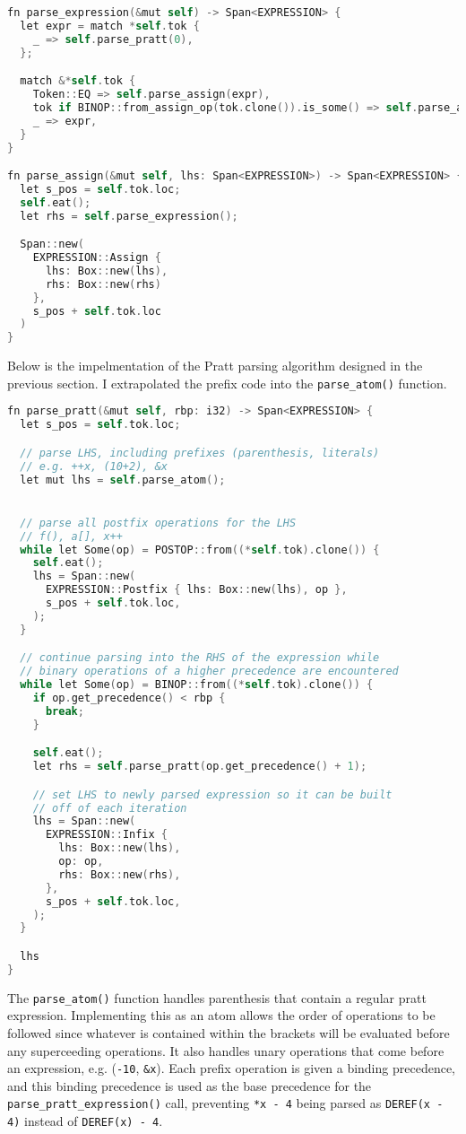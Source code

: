 \begin{lstlisting}[language=C]
fn parse_expression(&mut self) -> Span<EXPRESSION> {
  let expr = match *self.tok {
    _ => self.parse_pratt(0),
  };

  match &*self.tok {
    Token::EQ => self.parse_assign(expr),
    tok if BINOP::from_assign_op(tok.clone()).is_some() => self.parse_assign_op(expr),
    _ => expr,
  }
}

fn parse_assign(&mut self, lhs: Span<EXPRESSION>) -> Span<EXPRESSION> {
  let s_pos = self.tok.loc;
  self.eat();
  let rhs = self.parse_expression();

  Span::new(
    EXPRESSION::Assign { 
      lhs: Box::new(lhs), 
      rhs: Box::new(rhs) 
    }, 
    s_pos + self.tok.loc
  )
}
\end{lstlisting}

Below is the impelmentation of the Pratt parsing algorithm designed in the previous section. I extrapolated the prefix code into the \texttt{parse\_atom()} function. 

\label{PrattParser}
\begin{lstlisting}[language=C]
fn parse_pratt(&mut self, rbp: i32) -> Span<EXPRESSION> {
  let s_pos = self.tok.loc;

  // parse LHS, including prefixes (parenthesis, literals)
  // e.g. ++x, (10+2), &x
  let mut lhs = self.parse_atom();


  // parse all postfix operations for the LHS
  // f(), a[], x++
  while let Some(op) = POSTOP::from((*self.tok).clone()) {
    self.eat();
    lhs = Span::new(
      EXPRESSION::Postfix { lhs: Box::new(lhs), op },
      s_pos + self.tok.loc,
    );
  }

  // continue parsing into the RHS of the expression while 
  // binary operations of a higher precedence are encountered
  while let Some(op) = BINOP::from((*self.tok).clone()) {
    if op.get_precedence() < rbp {
      break;
    }

    self.eat();
    let rhs = self.parse_pratt(op.get_precedence() + 1);

    // set LHS to newly parsed expression so it can be built
    // off of each iteration 
    lhs = Span::new(
      EXPRESSION::Infix {
        lhs: Box::new(lhs),
        op: op,
        rhs: Box::new(rhs),
      },
      s_pos + self.tok.loc,
    );
  }

  lhs
}
\end{lstlisting}

The \texttt{parse\_atom()} function handles parenthesis that contain a regular pratt expression. Implementing this as an atom allows the order of operations to be followed since whatever is contained within the brackets will be evaluated before any superceeding operations. It also handles unary operations that come before an expression, e.g. (\texttt{-10}, \texttt{\&x}). Each prefix operation is given a binding precedence, and this binding precedence is used as the base precedence for the \texttt{parse\_pratt\_expression()} call, preventing \texttt{*x - 4} being parsed as \texttt{DEREF(x - 4)} instead of \texttt{DEREF(x) - 4}. 

